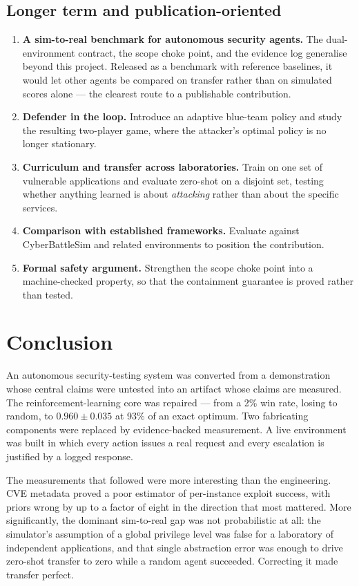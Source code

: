 \documentclass[11pt,a4paper]{report}
\begin{document}
\section{Longer term and publication-oriented}
\begin{enumerate}[leftmargin=*]
  \item \textbf{A sim-to-real benchmark for autonomous security agents.} The
  dual-environment contract, the scope choke point, and the evidence log
  generalise beyond this project. Released as a benchmark with reference
  baselines, it would let other agents be compared on transfer rather than on
  simulated scores alone --- the clearest route to a publishable contribution.
  \item \textbf{Defender in the loop.} Introduce an adaptive blue-team policy and
  study the resulting two-player game, where the attacker's optimal policy is no
  longer stationary.
  \item \textbf{Curriculum and transfer across laboratories.} Train on one set of
  vulnerable applications and evaluate zero-shot on a disjoint set, testing
  whether anything learned is about \emph{attacking} rather than about the
  specific services.
  \item \textbf{Comparison with established frameworks.} Evaluate against
  CyberBattleSim and related environments to position the contribution.
  \item \textbf{Formal safety argument.} Strengthen the scope choke point into a
  machine-checked property, so that the containment guarantee is proved rather
  than tested.
\end{enumerate}

\chapter{Conclusion}

An autonomous security-testing system was converted from a demonstration whose
central claims were untested into an artifact whose claims are measured. The
reinforcement-learning core was repaired --- from a 2\% win rate, losing to
random, to $0.960 \pm 0.035$ at 93\% of an exact optimum. Two fabricating
components were replaced by evidence-backed measurement. A live environment was
built in which every action issues a real request and every escalation is
justified by a logged response.

The measurements that followed were more interesting than the engineering. CVE
metadata proved a poor estimator of per-instance exploit success, with priors
wrong by up to a factor of eight in the direction that most mattered. More
significantly, the dominant sim-to-real gap was not probabilistic at all: the
simulator's assumption of a global privilege level was false for a laboratory of
independent applications, and that single abstraction error was enough to drive
zero-shot transfer to zero while a random agent succeeded. Correcting it made
transfer perfect.
\end{document}
